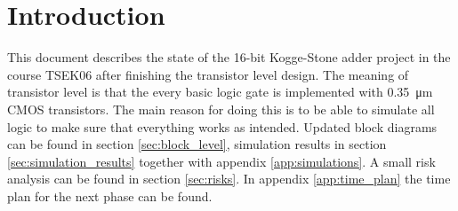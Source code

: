 \section{Introduction}
This document describes the state of the 16-bit Kogge-Stone adder project in the course TSEK06 after finishing the transistor level design. The meaning of transistor level is that the every basic logic gate is implemented with \SI{0.35}{\micro\m} CMOS transistors. The main reason for doing this is to be able to simulate all logic to make sure that everything works as intended. Updated block diagrams can be found in section \ref{sec:block_level}, simulation results in section \ref{sec:simulation_results} together with appendix \ref{app:simulations}. A small risk analysis can be found in section \ref{sec:risks}. In appendix \ref{app:time_plan} the time plan for the next phase can be found.

